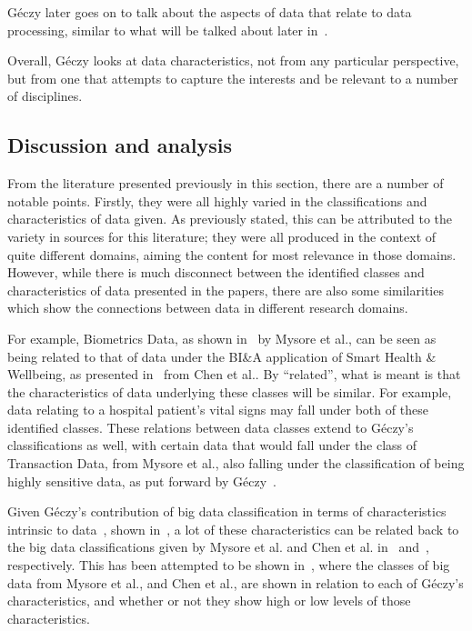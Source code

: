 G\'eczy later goes on to talk about the aspects of data that relate to data processing, similar to what will be talked
about later in~.

Overall, G\'eczy looks at data characteristics, not from any particular perspective, but from one that attempts to capture
the interests and be relevant to a number of disciplines.



\subsection{Discussion and analysis} %
\label{sub:classification_conclusion}

From the literature presented previously in this section, there are a number of notable points. Firstly, they were all
highly varied in the classifications and characteristics of data given. As previously stated, this can be attributed
to the variety in sources for this literature; they were all produced in the context of quite different domains, aiming
the content for most relevance in those domains. However, while there is much disconnect between the identified classes and
characteristics of data presented in the papers, there are also some similarities which show the connections
between data in different research domains.

For example, Biometrics Data, as shown in~ by Mysore et al.\cite{ibm_big_2013}, can be seen as
being related to that of data under the BI\&A application of Smart Health \& Wellbeing, as presented
in~ from Chen et al.\cite{chen2012business}. By ``related'', what is meant is that the
characteristics of data underlying these classes will be similar. For example, data relating to a hospital patient's
vital signs may fall under both of these identified classes. These relations between data classes extend to G\'eczy's
classifications as well, with certain data that would fall under the class of Transaction Data, from Mysore et
al.\cite{ibm_big_2013}, also falling under the classification of being highly sensitive data, as put forward by
G\'eczy~\cite{geczy_big_2014}.

Given G\'eczy's contribution of big data classification in terms of characteristics intrinsic to
data~\cite{geczy_big_2014}, shown in~, a lot of these characteristics can be related back
to the big data classifications given by Mysore et al.\cite{ibm_big_2013} and Chen et al.\cite{chen2012business}
in~ and~, respectively. This has been attempted to be shown
in~, where the classes of big data from Mysore et al., and Chen et al., are shown in
relation to each of G\'eczy's characteristics, and whether or not they show high or low levels of those characteristics.

